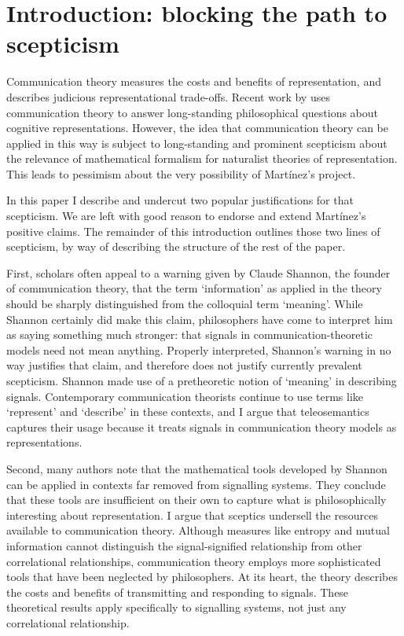 \section{Introduction: blocking the path to scepticism}\label{sec:intro}

Communication theory measures the costs and benefits of representation, and describes judicious representational trade-offs. 
Recent work by \citet{martinez2019representations} uses communication theory to answer long-standing philosophical questions about cognitive representations.
However, the idea that communication theory can be applied in this way is subject to long-standing and prominent scepticism about the relevance of mathematical formalism for naturalist theories of representation.
This leads to pessimism about the very possibility of Mart\'{i}nez's project.

In this paper I describe and undercut two popular justifications for that scepticism.
We are left with good reason to endorse and extend Mart\'{i}nez's positive claims.
The remainder of this introduction outlines those two lines of scepticism, by way of describing the structure of the rest of the paper.

First, scholars often appeal to a warning given by Claude Shannon, the founder of communication theory, that the term `information' as applied in the theory should be sharply distinguished from the colloquial term `meaning'.
While Shannon certainly did make this claim, philosophers have come to interpret him as saying something much stronger: that signals in communication-theoretic models need not mean anything.
Properly interpreted, Shannon's warning in no way justifies that claim, and therefore does not justify currently prevalent scepticism.
Shannon made use of a pretheoretic notion of `meaning' in describing signals.
Contemporary communication theorists continue to use terms like `represent' and `describe' in these contexts, and I argue that teleosemantics captures their usage because it treats signals in communication theory models as representations.

Second, many authors note that the mathematical tools developed by Shannon can be applied in contexts far removed from signalling systems.
They conclude that these tools are insufficient on their own to capture what is philosophically interesting about representation.
I argue that sceptics undersell the resources available to communication theory.
Although measures like entropy and mutual information cannot distinguish the signal-signified relationship from other correlational relationships, communication theory employs more sophisticated tools that have been neglected by philosophers.
At its heart, the theory describes the costs and benefits of transmitting and responding to signals.
These theoretical results apply specifically to signalling systems, not just any correlational relationship.

